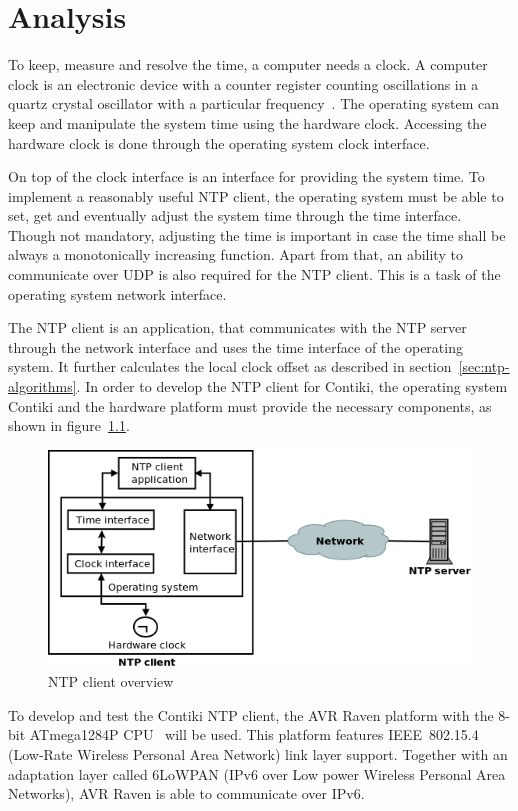 
\chapter{Analysis}
To keep, measure and resolve the time, a computer needs a clock.
A computer clock is an electronic device with a counter register counting oscillations in a
quartz crystal oscillator with a particular frequency~\cite{thesis-sync}.
The operating system can keep and manipulate the system time using the hardware clock.
Accessing the hardware clock is done through the operating system clock interface.

On top of the clock interface is an interface for providing the system time.
To implement a reasonably useful NTP client,
the operating system must be able to set, get and eventually adjust the system time
through the time interface.
Though not mandatory, adjusting the time is important
in case the time shall be always a monotonically increasing function.
Apart from that, an ability to communicate over UDP is also required for the NTP client.
This is a task of the operating system network interface.

The NTP client is an application, that communicates with the NTP server through the network interface
and uses the time interface of the operating system.
It further calculates the local clock offset as described in section~\ref{sec:ntp-algorithms}.
In order to develop the NTP client for Contiki,
the operating system Contiki and the hardware platform must provide the necessary
components, as shown in figure~\ref{fig:analysis-overview}.
\begin{figure}
  \centering
  \includegraphics[width=13cm,keepaspectratio]{fig/analysis.png}
  \caption{NTP client overview}
  \label{fig:analysis-overview}
\end{figure}

To develop and test the Contiki NTP client,
the AVR Raven platform with the 8-bit ATmega1284P CPU~\cite{avr-datasheet} will be used.
This platform features IEEE~802.15.4 (Low-Rate Wireless Personal Area Network) link layer support.
Together with an adaptation layer called 6LoWPAN (IPv6 over Low power Wireless Personal Area Networks),
AVR Raven is able to communicate over IPv6.








